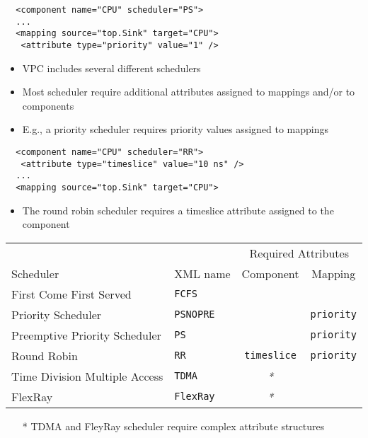 \begin{frame}[fragile=singleslide]
\begin{lstlisting}
  <component name="CPU" scheduler="PS">
  ...
  <mapping source="top.Sink" target="CPU">
   <attribute type="priority" value="1" />
\end{lstlisting}
\begin{itemize}
\item VPC includes several different schedulers
\item Most scheduler require additional attributes assigned to mappings and/or to components
\item E.g., a priority scheduler requires priority values assigned to mappings
\end{itemize}
\begin{lstlisting}
  <component name="CPU" scheduler="RR">
   <attribute type="timeslice" value="10 ns" />
  ...
  <mapping source="top.Sink" target="CPU">
\end{lstlisting}
\begin{itemize}
\item The round robin scheduler requires a timeslice attribute assigned to the component
\end{itemize}
\end{frame}


\begin{frame}[fragile=singleslide]
\begin{tabular}{llcc}
\toprule
&& \multicolumn{2}{c}{Required Attributes} \\
\cmidrule(r){3-4}
Scheduler & XML name & Component & Mapping \\
\midrule
First Come First Served      & \lstinline!FCFS!    & &  \\
Priority Scheduler           & \lstinline!PSNOPRE! & & \lstinline!priority! \\
Preemptive Priority Scheduler& \lstinline!PS!      & & \lstinline!priority! \\
Round Robin                  & \lstinline!RR! & \lstinline!timeslice! & \lstinline!priority!  \\
Time Division Multiple Access& \lstinline!TDMA!    & \emph{*} & \\
FlexRay                      & \lstinline!FlexRay! & \emph{*} & \\
\bottomrule
\end{tabular}

\begin{itemize}
\item[*] TDMA and FleyRay scheduler require complex attribute structures
\end{itemize}
\end{frame}



